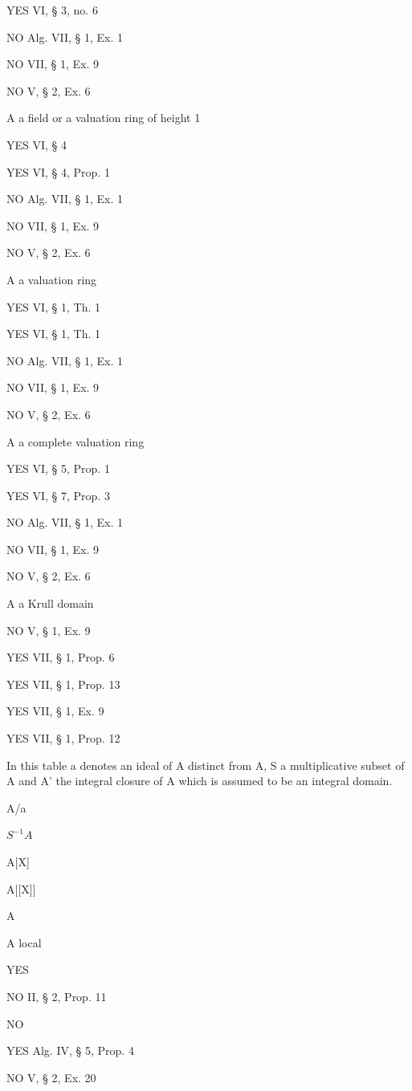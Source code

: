 YES VI, § 3, no. 6

NO Alg. VII, § 1, Ex. 1

NO VII, § 1, Ex. 9

NO V, § 2, Ex. 6

A a field or a valuation ring of height 1

YES VI, § 4

YES VI, § 4, Prop. 1

NO Alg. VII, § 1, Ex. 1

NO VII, § 1, Ex. 9

NO V, § 2, Ex. 6

A a valuation ring

YES VI, § 1, Th. 1

YES VI, § 1, Th. 1

NO Alg. VII, § 1, Ex. 1

NO VII, § 1, Ex. 9

NO V, § 2, Ex. 6

A a complete valuation ring

YES VI, § 5, Prop. 1

YES VI, § 7, Prop. 3

NO Alg. VII, § 1, Ex. 1

NO VII, § 1, Ex. 9

NO V, § 2, Ex. 6

A a Krull domain

NO V, § 1, Ex. 9

YES VII, § 1, Prop. 6

YES VII, § 1, Prop. 13

YES VII, § 1, Ex. 9

YES VII, § 1, Prop. 12


In this table a denotes an ideal of A distinct from A, S a multiplicative subset of A and A' the integral closure of A which is assumed to be an integral domain.

A/a

\(S^{-1}A\)

A{[}X{]}

A{[}{[}X{]}{]}

A\textquotesingle{}

A local

YES

NO II, § 2, Prop. 11

NO

YES Alg. IV, § 5, Prop. 4

NO V, § 2, Ex. 20

